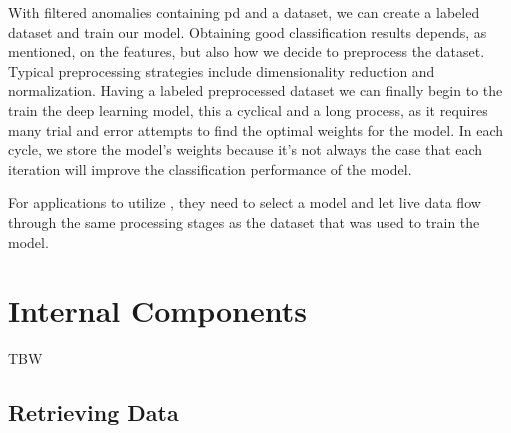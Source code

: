 With filtered anomalies containing \ac{pd} and a dataset, we can create a labeled dataset and train our model. Obtaining good classification results depends, as mentioned, on the features, but also how we decide to preprocess the dataset. Typical preprocessing strategies include dimensionality reduction and normalization. Having a labeled preprocessed dataset we can finally begin to the train the deep learning model, this a cyclical and a long process, as it requires many trial and error attempts to find the optimal weights for the model. In each cycle, we store the model's weights because it's not always the case that each iteration will improve the classification performance of the model.

For applications to utilize \project, they need to select a model and let live data flow through the same processing stages as the dataset that was used to train the model.

\section{Internal Components}
TBW

\subsection{Retrieving Data}


